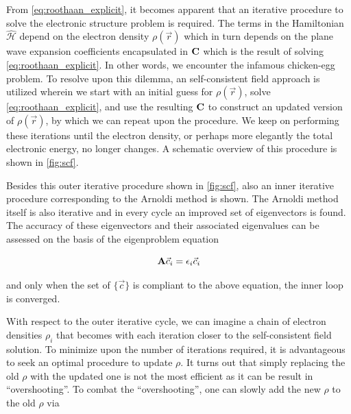 \begin{Figure}
    \centering
    \resizebox{0.9 \textwidth}{!}{
        
    }
    \label{fig:scf}
\end{Figure}

From \cref{eq:roothaan_explicit}, it becomes apparent that an iterative procedure to solve the electronic structure problem is required. The terms in the Hamiltonian $\hat{\mathcal{H}}$ depend on the electron density $\rho(\vec{r})$ which in turn depends on the plane wave expansion coefficients encapsulated in $\mathbf{C}$ which is the result of solving \cref{eq:roothaan_explicit}. In other words, we encounter the infamous chicken-egg problem. To resolve upon this dilemma, an self-consistent field approach is utilized wherein we start with an initial guess for $\rho(\vec{r})$, solve \cref{eq:roothaan_explicit}, and use the resulting $\mathbf{C}$ to construct an updated version of $\rho(\vec{r})$, by which we can repeat upon the procedure. We keep on performing these iterations until the electron density, or perhaps more elegantly the total electronic energy, no longer changes. A schematic overview of this procedure is shown in \cref{fig:scf}.

Besides this outer iterative procedure shown in \cref{fig:scf}, also an inner iterative procedure corresponding to the Arnoldi method is shown. The Arnoldi method itself is also iterative and in every cycle an improved set of eigenvectors is found. The accuracy of these eigenvectors and their associated eigenvalues can be assessed on the basis of the eigenproblem equation

\begin{equation}
    \mathbf{A} \vec{c}_{i} = \epsilon_{i} \vec{c}_{i}
\end{equation}

and only when the set of $\{ \vec{c} \}$ is compliant to the above equation, the inner loop is converged.

With respect to the outer iterative cycle, we can imagine a chain of electron densities $\rho_{i}$ that becomes with each iteration closer to the self-consistent field solution. To minimize upon the number of iterations required, it is advantageous to seek an optimal procedure to update $\rho$. It turns out that simply replacing the old $\rho$ with the updated one is not the most efficient as it can be result in ``overshooting''. To combat the ``overshooting'', one can slowly add the new $\rho$ to the old $\rho$ via

